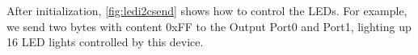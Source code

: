 After initialization, \autoref{fig:ledi2csend} shows how to control the LEDs. For example, we send two bytes with content 0xFF to the Output Port0 and Port1, lighting up 16 LED lights controlled by this device.




%
%
%
%
